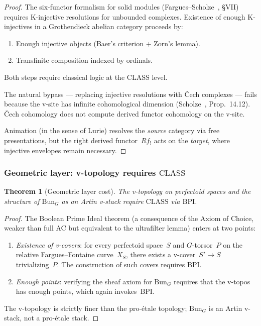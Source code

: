 \documentclass[12pt, a4paper]{article}
\theoremstyle{plain}
\newtheorem{theorem}{Theorem}[section]
\theoremstyle{definition}
\theoremstyle{remark}
\newcommand{\CLASS}{\mathrm{CLASS}}
\newcommand{\BPI}{\mathrm{BPI}}
\begin{document}
\begin{proof}
The six-functor formalism for solid modules (Fargues--Scholze~\cite{fargues-scholze}, \S VII) requires K-injective
resolutions for unbounded complexes.  Existence of enough
K-injectives in a Grothendieck abelian category proceeds by:
\begin{enumerate}[label=(\arabic*)]
  \item Enough injective objects (Baer's criterion $+$ Zorn's lemma).
  \item Transfinite composition indexed by ordinals.
\end{enumerate}
Both steps require classical logic at the $\CLASS$ level.

The natural bypass --- replacing injective resolutions with \v{C}ech
complexes --- fails because the v-site has infinite cohomological
dimension (Scholze~\cite{scholze-diamonds}, Prop.~14.12).  \v{C}ech
cohomology does not compute derived functor cohomology on the v-site.

Animation (in the sense of Lurie) resolves the \emph{source} category
via free presentations, but the right derived functor~$Rf_!$ acts on
the \emph{target}, where injective envelopes remain necessary.
\end{proof}

\subsubsection{Geometric layer: v-topology requires $\CLASS$}

\begin{theorem}[Geometric layer cost]\label{thm:geometric}
The v-topology on perfectoid spaces and the structure of
$\mathrm{Bun}_G$ as an Artin v-stack require $\CLASS$ via $\BPI$.
\end{theorem}

\begin{proof}
The Boolean Prime Ideal theorem (a consequence of the Axiom of
Choice, weaker than full AC but equivalent to the ultrafilter
lemma) enters at two points:
\begin{enumerate}[label=(\arabic*)]
  \item \emph{Existence of v-covers}: for every perfectoid space~$S$
    and $G$-torsor~$P$ on the relative Fargues--Fontaine curve~$X_S$,
    there exists a v-cover~$S' \to S$ trivializing~$P$.  The
    construction of such covers requires $\BPI$.
  \item \emph{Enough points}: verifying the sheaf axiom for
    $\mathrm{Bun}_G$ requires that the v-topos has enough points,
    which again invokes~$\BPI$.
\end{enumerate}
The v-topology is strictly finer than the pro-\'etale topology;
$\mathrm{Bun}_G$ is an Artin v-stack, not a pro-\'etale stack.
\end{proof}
\end{document}
